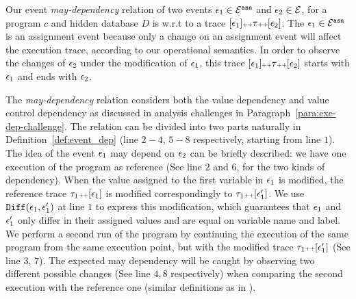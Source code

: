 Our event \emph{may-dependency} relation of 
two events $\mathtt{\epsilon}_1 \in \mathcal{E}^{\mathtt{{asn}}}$ and $\mathtt{\epsilon}_2 \in \mathcal{E}$, 
for a program $c$ and hidden database $D$ is w.r.t to
a trace $[\mathtt{\epsilon}_1 ] {\scriptscriptstyle ++} \mathtt{\tau} {\scriptscriptstyle ++} [\mathtt{\epsilon}_2]$.
The $\mathtt{\epsilon}_1 \in \mathcal{E}^{\mathtt{{asn}}}$ is an assignment event because only a change on an assignment event will affect the execution trace, according to our operational semantics.
In order to observe the changes of $\mathtt{\epsilon}_2$ under the modification of $\mathtt{\epsilon}_1$, this trace 
$[\mathtt{\epsilon}_1 ] {\scriptscriptstyle ++} \mathtt{\tau} {\scriptscriptstyle ++} [\mathtt{\epsilon}_2]$
starts with $\mathtt{\epsilon}_1$ and ends with $\mathtt{\epsilon}_2$.
{The \emph{may-dependency} relation considers both the value dependency and value control dependency as discussed in 
analysis challenges in Paragraph~\ref{para:exe-dep-challenge}. The relation can be divided into two parts naturally in Definition~\ref{def:event_dep} (line $2-4$, $5-8$ respectively, starting from line $1$). The idea of the event $\mathtt{\epsilon}_1$ may depend on $\mathtt{\epsilon}_2$ can be briefly described:
we have one execution of the program as reference (See line $2$ and $6$, for the two kinds of dependency). 
When the value assigned to the 
first variable in $\mathtt{\epsilon}_1$ is modified, the reference trace $\mathtt{\tau}_1 {\scriptscriptstyle ++} [\mathtt{\epsilon}_1]$ is modified correspondingly to $\mathtt{\tau}_1 {\scriptscriptstyle ++} [\mathtt{\epsilon}_1']$.
We use $\mathtt{Diff}(\mathtt{\epsilon}_1, \mathtt{\epsilon}_1')$ at line $1$ to express this modification, which guarantees that $\mathtt{\epsilon}_1$ and $\mathtt{\epsilon}_1'$ only differ in their assigned values and are equal on variable name and label. We perform a second run of the program by continuing the execution of the same program from the same execution point, 
but with the modified trace $\mathtt{\tau}_1 {\scriptscriptstyle ++} [\mathtt{\epsilon}_1']$ (See line $3$, $7$). 
The expected may dependency will be caught by observing two different possible changes (See line $4, 8$ respectively) when comparing the second execution with the reference one (similar definitions as in \cite{Cousot19a}). 

}
